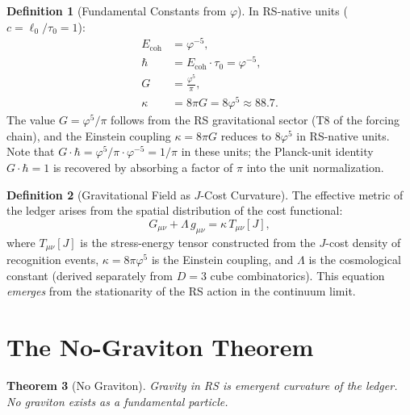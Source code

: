 \documentclass[12pt,a4paper]{article}
\newtheorem{theorem}{Theorem}[section]
\theoremstyle{definition}
\newtheorem{definition}[theorem]{Definition}
\theoremstyle{remark}
\begin{document}
\begin{definition}[Fundamental Constants from $\varphi$]
\label{def:constants}
In RS-native units ($c = \ell_0/\tau_0 = 1$):
\begin{align}
  E_{\mathrm{coh}} &= \varphi^{-5}, \label{eq:ecoh} \\
  \hbar &= E_{\mathrm{coh}} \cdot \tau_0 = \varphi^{-5}, \label{eq:hbar} \\
  G &= \frac{\varphi^5}{\pi}, \label{eq:G} \\
  \kappa &= 8\pi G = 8\varphi^5 \approx 88.7. \label{eq:kappa}
\end{align}
The value $G = \varphi^5/\pi$ follows from the RS gravitational sector
(T8 of the forcing chain), and the Einstein coupling $\kappa = 8\pi G$
reduces to $8\varphi^5$ in RS-native units.  Note that
$G \cdot \hbar = \varphi^5/\pi \cdot \varphi^{-5} = 1/\pi$ in these
units; the Planck-unit identity $G \cdot \hbar = 1$ is recovered by
absorbing a factor of $\pi$ into the unit normalization.
\end{definition}

\begin{definition}[Gravitational Field as $J$-Cost Curvature]
\label{def:grav-field}
The effective metric of the ledger arises from the spatial
distribution of the cost functional:
\begin{equation}
  G_{\mu\nu} + \Lambda\, g_{\mu\nu} = \kappa\, T_{\mu\nu}[J],
  \label{eq:efe}
\end{equation}
where $T_{\mu\nu}[J]$ is the stress-energy tensor constructed
from the $J$-cost density of recognition events, $\kappa = 8\pi\varphi^5$
is the Einstein coupling, and $\Lambda$ is the cosmological
constant (derived separately from $D = 3$ cube combinatorics).
This equation \emph{emerges} from the stationarity of the RS
action in the continuum limit.
\end{definition}

\section{The No-Graviton Theorem}
\label{sec:no-graviton}

\begin{theorem}[No Graviton]
\label{thm:no-graviton}
Gravity in RS is emergent curvature of the ledger.  No graviton
exists as a fundamental particle.
\end{theorem}
\end{document}
